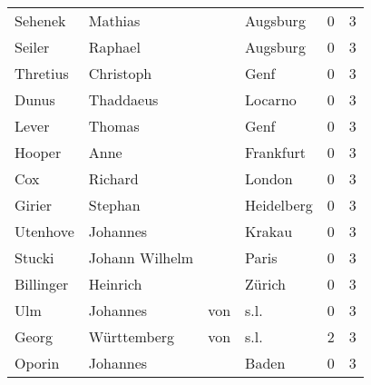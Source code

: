 \begin{tabular}{llllrr}
                  Sehenek &                            Mathias &             &                                    Augsburg &          0 &         3 \\
                   Seiler &                            Raphael &             &                                    Augsburg &          0 &         3 \\
                 Thretius &                          Christoph &             &                                        Genf &          0 &         3 \\
                    Dunus &                          Thaddaeus &             &                                     Locarno &          0 &         3 \\
                    Lever &                             Thomas &             &                                        Genf &          0 &         3 \\
                   Hooper &                               Anne &             &                                   Frankfurt &          0 &         3 \\
                      Cox &                            Richard &             &                                      London &          0 &         3 \\
                   Girier &                            Stephan &             &                                  Heidelberg &          0 &         3 \\
                 Utenhove &                           Johannes &             &                                      Krakau &          0 &         3 \\
                   Stucki &                     Johann Wilhelm &             &                                       Paris &          0 &         3 \\
                Billinger &                           Heinrich &             &                                      Zürich &          0 &         3 \\
                      Ulm &                           Johannes &         von &                                        s.l. &          0 &         3 \\
                    Georg &                        Württemberg &         von &                                        s.l. &          2 &         3 \\
                   Oporin &                           Johannes &             &                                       Baden &          0 &         3 \\

\end{tabular}
